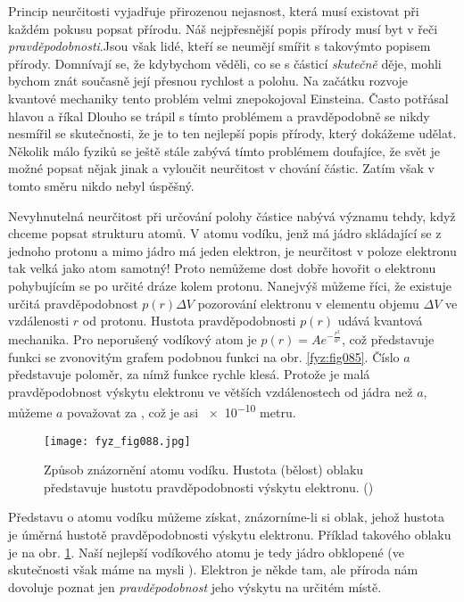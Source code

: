     Princip neurčitosti vyjadřuje přirozenou nejasnost, která musí existovat při každém pokusu 
    popsat přírodu. Náš nejpřesnější popis přírody musí byt v řeči \emph{pravděpodobnosti}.Jsou 
    však lidé, kteří se neumějí smířit s takovýmto popisem přírody. Domnívají se, že kdybychom 
    věděli, co se s částicí  \emph{skutečně} děje, mohli bychom znát současně její přesnou rychlost 
    a polohu. Na začátku rozvoje kvantové mechaniky tento problém velmi znepokojoval Einsteina. 
    Často potřásal hlavou a říkal  Dlouho se trápil s tímto problémem a pravděpodobně se nikdy nesmířil se skutečnosti, 
    že je to ten nejlepší popis přírody, který dokážeme udělat. Několik málo fyziků se ještě stále 
    zabývá tímto problémem doufajíce, že svět je možné popsat nějak jinak a vyloučit neurčitost v 
    chování částic. Zatím však v tomto směru nikdo nebyl úspěšný. 
    
    Nevyhnutelná neurčitost při určování polohy částice nabývá významu tehdy, když chceme popsat 
    strukturu atomů. V atomu vodíku, jenž má jádro skládající se z jednoho protonu a mimo jádro má 
    jeden elektron, je neurčitost v poloze elektronu tak velká jako atom samotný! Proto nemůžeme 
    dost dobře hovořit o elektronu pohybujícím se po určité dráze kolem protonu. Nanejvýš můžeme 
    říci, že existuje určitá pravděpodobnost \(p(r)\Delta V\) pozorování elektronu v elementu 
    objemu \(\Delta V\) ve vzdálenosti \(r\) od protonu. Hustota pravděpodobnosti \(p(r)\) udává 
    kvantová mechanika. Pro neporušený vodíkový atom je \(p(r) = Ae^{-\frac{r^2}{a^2}}\), což 
    představuje funkci se zvonovitým grafem podobnou funkci na obr. \ref{fyz:fig085}. Číslo \(a\) 
    představuje  poloměr, za nímž funkce rychle klesá. Protože je malá 
    pravděpodobnost výskytu elektronu ve větších vzdálenostech od jádra než \(a\), můžeme \(a\) 
    považovat za , což je asi \num{e-10} metru. 

    \begin{figure}[ht!]  %
      \centering
      \texttt{[image: fyz\_fig088.jpg]}
      \caption{Způsob znázornění atomu vodíku. Hustota (bělost) oblaku představuje hustotu 
               pravděpodobnosti výskytu elektronu. 
               (\cite[s.~90]{Feynman01})}
      \label{fyz:fig088}
    \end{figure}
    Představu o atomu vodíku můžeme získat, znázorníme-li si oblak, jehož hustota je úměrná hustotě 
    pravděpodobnosti výskytu elektronu. Příklad takového oblaku je na obr. \ref{fyz:fig088}. Naší 
    nejlepší  vodíkového atomu je tedy jádro obklopené  (ve 
    skutečnosti však máme na mysli ). Elektron je někde tam, ale příroda 
    nám dovoluje poznat jen \emph{pravděpodobnost} jeho výskytu na určitém místě.
    
